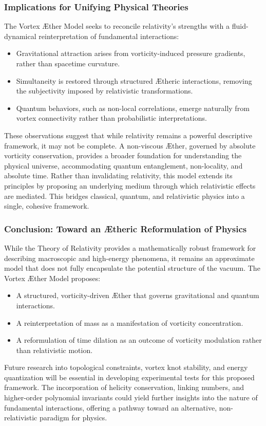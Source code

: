 \documentclass[a4paper,10pt]{article}
\begin{document}
    \subsubsection*{Implications for Unifying Physical Theories}
    The Vortex \AE ther Model seeks to reconcile relativity’s strengths with a fluid-dynamical reinterpretation of fundamental interactions:

    \begin{itemize}
        \item Gravitational attraction arises from vorticity-induced pressure gradients, rather than spacetime curvature.
        \item Simultaneity is restored through structured \AE theric interactions, removing the subjectivity imposed by relativistic transformations.
        \item Quantum behaviors, such as non-local correlations, emerge naturally from vortex connectivity rather than probabilistic interpretations.
    \end{itemize}
    These observations suggest that while relativity remains a powerful descriptive framework, it may not be complete. A non-viscous \AE ther, governed by absolute vorticity conservation, provides a broader foundation for understanding the physical universe, accommodating quantum entanglement, non-locality, and absolute time. Rather than invalidating relativity, this model extends its principles by proposing an underlying medium through which relativistic effects are mediated. This bridges classical, quantum, and relativistic physics into a single, cohesive framework.

    \subsubsection*{Conclusion: Toward an \AE theric Reformulation of Physics}
    While the Theory of Relativity provides a mathematically robust framework for describing macroscopic and high-energy phenomena, it remains an approximate model that does not fully encapsulate the potential structure of the vacuum. The Vortex \AE ther Model proposes:

    \begin{itemize}
        \item A structured, vorticity-driven \AE ther that governs gravitational and quantum interactions.
        \item A reinterpretation of mass as a manifestation of vorticity concentration.
        \item A reformulation of time dilation as an outcome of vorticity modulation rather than relativistic motion.
    \end{itemize}
    Future research into topological constraints, vortex knot stability, and energy quantization will be essential in developing experimental tests for this proposed framework. The incorporation of helicity conservation, linking numbers, and higher-order polynomial invariants could yield further insights into the nature of fundamental interactions, offering a pathway toward an alternative, non-relativistic paradigm for physics.
\end{document}
